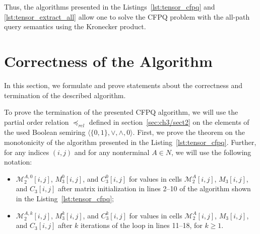 Thus, the algorithms presented in the Listings~\ref{lst:tensor_cfpq} and \ref{lst:tensor_extract_all} allow one to solve the CFPQ problem with the all-path query semantics using the Kronecker product.


\section{Correctness of the Algorithm}\label{sec:ch4/sect2}
In this section, we formulate and prove statements about the correctness and termination of the described algorithm.

To prove the termination of the presented CFPQ algorithm, we will use the partial order relation $\preceq_{\textit{rel}}$ defined in section~\ref{sec:ch3/sect2} on the elements of the used Boolean semiring $\langle \{0, 1\}, \vee, \wedge, 0 \rangle$. First, we prove the theorem on the monotonicity of the algorithm presented in the Listing~\ref{lst:tensor_cfpq}. Further, for any indices $(i, j)$ and for any nonterminal $A \in N$, we will use the following notation:
\begin{itemize}
    \item $\mathcal{M}_2^{A, 0}[i, j]$, $M_3^{0}[i, j]$, and $C_3^{0}[i, j]$ for values in cells $\mathcal{M}_2^{A}[i, j]$, $M_3[i, j]$, and $C_3[i, j]$ after matrix initialization in lines 2--10 of the algorithm shown in the Listing~\ref{lst:tensor_cfpq};
    \item $\mathcal{M}_2^{A, k}[i, j]$, $M_3^{k}[i, j]$, and $C_3^{k}[i, j]$ for values in cells $\mathcal{M}_2^{A}[i, j]$, $M_3[i, j]$, and $C_3[i, j]$ after $k$ iterations of the loop in lines 11--18, for $k \geq 1$.
\end{itemize}

